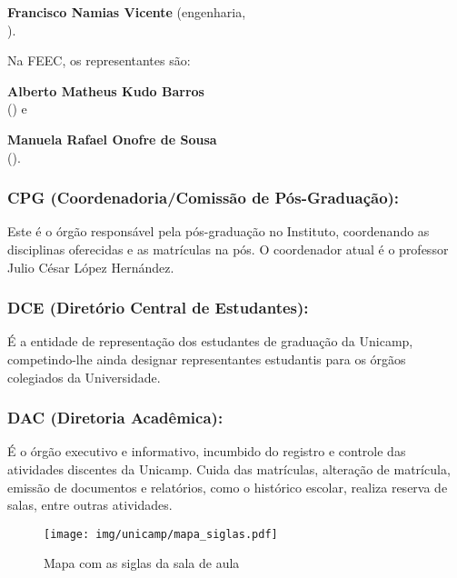 \begin{compactitemize}
\item \textbf{Francisco Namias Vicente} (engenharia, 
  \\ ).
\end{compactitemize}

Na FEEC, os representantes são:

\begin{compactitemize}
\item \textbf{Alberto Matheus Kudo Barros}
  \\ () e
\item \textbf{Manuela Rafael Onofre de Sousa}
  \\ ().
\end{compactitemize}

\subsubsection{CPG (Coordenadoria/Comissão de Pós-Graduação):} Este é o órgão
responsável pela pós-graduação no Instituto, coordenando as disciplinas
oferecidas e as matrículas na pós. O coordenador atual é o professor Julio
César López Hernández.

\subsubsection{DCE (Diretório Central de Estudantes):} É a entidade de
representação dos estudantes de graduação da Unicamp, competindo-lhe ainda
designar representantes estudantis para os órgãos colegiados da Universidade.

\subsubsection{DAC (Diretoria Acadêmica):} É o órgão executivo e informativo,
incumbido do registro e controle das atividades discentes da Unicamp. Cuida das
matrículas, alteração de matrícula, emissão de documentos e relatórios, como o
histórico escolar, realiza reserva de salas, entre outras atividades.

\begin{figure*}[hb!]
  \centering
  \texttt{[image: img/unicamp/mapa\_siglas.pdf]}
  \caption{Mapa com as siglas da sala de aula}
  \label{fig:mapa_siglas}
\end{figure*}

